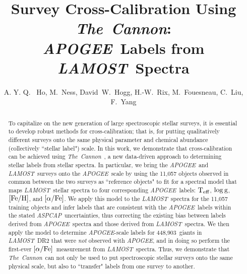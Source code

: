 \documentclass[12pt, preprint]{aastex}
\newcommand{\tc}{\textsl{The~Cannon}}
\newcommand{\apogee}{\textsl{APOGEE}}
\newcommand{\aspcap}{\textsl{ASPCAP}}
\newcommand{\lamost}{\textsl{LAMOST}}
\newcommand{\teff}{\mbox{$\rm T_{eff}$}}
\newcommand{\feh}{\mbox{$\rm [Fe/H]$}}
\newcommand{\alphafe}{\mbox{$\rm [\alpha/Fe]$}}
\newcommand{\logg}{\mbox{$\rm \log g$}}
\newcommand{\ntestobj}{448,903}
\begin{document}
\title{Survey Cross-Calibration Using \tc: \\ \apogee\ Labels from \lamost\ Spectra}
\author{A. Y. Q. ~Ho,
M.~Ness,
David~W.~Hogg, 
H.-W.~Rix,
M.~Fouesneau,
C.~Liu,
F.~Yang
}


\begin{abstract}

To capitalize on the new generation of large spectroscopic stellar surveys, 
it is essential to develop robust methods for cross-calibration; that is, for putting 
qualitatively different surveys onto the same physical parameter and chemical
abundance (collectively ``stellar label") scale. In this work, we demonstrate that
cross-calibration can be achieved using \tc\ \citep{ness2015}, a new data-driven
approach to determining stellar labels from stellar spectra. 
In particular, we bring the \apogee\ and \lamost\ surveys onto the \apogee\
scale by using the 11,057 objects observed in common between the
two surveys as ``reference objects" to fit for a spectral model that 
maps \lamost\ stellar spectra to four corresponding \apogee\ labels: 
\teff, \logg, \feh, and \alphafe. 
We apply this model to the \lamost\ spectra for the 11,057 training objects
and infer labels that are consistent with the \apogee\ labels within 
the stated \aspcap\ uncertainties, thus correcting the existing bias between labels 
derived from \apogee\ spectra and those derived from \lamost\ spectra. 
We then apply the model to determine \apogee-scale labels for 
\ntestobj\ giants in \lamost\ DR2 that were \emph{not} 
observed with \apogee, and in doing so perform the first-ever
\alphafe\ measurement from \lamost\ 
spectra. Thus, we demonstrate that \tc\ can not only be used to put
spectroscopic stellar surveys onto the same physical scale, but also to
``transfer" labels from one survey to another. 

\end{abstract}
\end{document}
